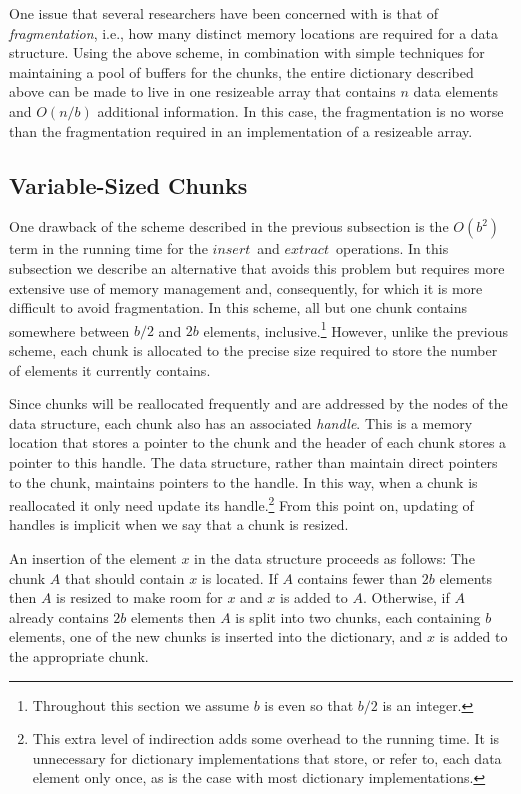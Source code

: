 \documentclass{DIKU-article}
\newcommand{\Insert}{\mbox{$\mathit{insert}$}}
\newcommand{\Extract}{\mbox{$\mathit{extract}$}}
\begin{document}
One issue that several researchers have been concerned with is that of
\emph{fragmentation}, i.e., how many distinct memory locations are
required for a data structure.  Using the above scheme, in combination
with simple techniques for maintaining a pool of buffers for the
chunks, the entire dictionary described above can be made to live in
one resizeable array that contains $n$ data elements and $O(n/b)$
additional information.   In this case, the fragmentation is no worse
than the fragmentation required in an implementation of a resizeable
array.

\subsection{Variable-Sized Chunks}

One drawback of the scheme described in the previous subsection is the
$O(b^2)$ term in the running time for the \Insert\ and \Extract\
operations.  In this subsection we describe an alternative that avoids
this problem but requires more extensive use of memory management and,
consequently, for which it is more difficult to avoid fragmentation.
In this scheme, all but one chunk contains somewhere between $b/2$ and
$2b$ elements, inclusive.\footnote{Throughout this section we assume
$b$ is even so that $b/2$ is an integer.}  However, unlike the
previous scheme, each chunk is allocated to the precise size required
to store the number of elements it currently contains.

Since chunks will be reallocated frequently and are addressed by the
nodes of the data structure, each chunk also has an associated
\emph{handle}.  This is a memory location that stores a pointer to the
chunk and the header of each chunk stores a pointer to this handle.
The data structure, rather than maintain direct pointers to the
chunk, maintains pointers to the handle.  In this way, when a chunk
is reallocated it only need update its handle.\footnote{This extra
level of indirection adds some overhead to the running time.  It is
unnecessary for dictionary implementations that store, or refer to,
each data element only once, as is the case with most dictionary
implementations.} From this point on, updating of handles is implicit
when we say that a chunk is resized.

An insertion of the element $x$ in the data structure proceeds as
follows: The chunk $A$ that should contain $x$ is located.  If $A$
contains fewer than $2b$ elements then $A$ is resized to make room for
$x$ and $x$ is added to $A$.  Otherwise, if $A$ already contains $2b$
elements then $A$ is split into two chunks, each containing $b$
elements, one of the new chunks is inserted into the dictionary, and
$x$ is added to the appropriate chunk.
\end{document}
